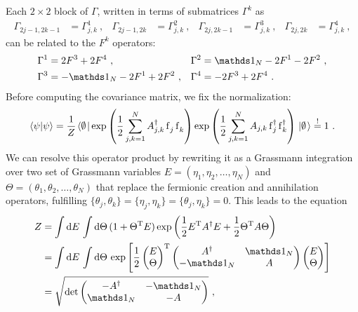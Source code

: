 \documentclass[letter]{article}
\newcommand{\intd}[1]{\int\mathrm{d}#1\,}
\begin{document}
Each $2 \times 2$ block of $\Gamma$, written in terms of submatrices $\Gamma^k$ as
\begin{equation}
\begin{aligned}
\Gamma_{2j-1,2k-1} &= \Gamma^1_{j,k} \ ,&
\Gamma_{2j-1,2k} &= \Gamma^2_{j,k} \ , &
\Gamma_{2j,2k-1} &= \Gamma^3_{j,k} \ ,&
\Gamma_{2j,2k} &= \Gamma^4_{j,k} \ ,
\end{aligned}
\end{equation}
can be related to the $F^k$ operators:
\begin{equation}
\begin{aligned}
\Gamma^1 &= 2F^3 + 2F^4 \ ,&
\Gamma^2 &= \id_N -2F^1 - 2F^2 \ ,\\
\Gamma^3 &= -\id_N - 2 F^1 + 2F^2 \ ,&
\Gamma^4 &= -2F^3 + 2F^4 \ .
\end{aligned}
\end{equation}
Before computing the covariance matrix, we fix the normalization:
\begin{equation}
\braket{\psi}\psi = \frac{1}{Z} \vacbra \exp\left( \frac{1}{2} \sum_{j,k=1}^N A^\dagger_{j,k} \fe_j \fe_k \right) \exp\left( \frac{1}{2} \sum_{j,k=1}^N A_{j,k} \fd_j \fd_k \right) \vacket \overset{!}{=} 1 \ .
\end{equation}
We can resolve this operator product by rewriting it as a Grassmann integration over two set of Grassmann variables $E=(\eta_1,\eta_2,\dots,\eta_N)$ and $\Theta=(\theta_1,\theta_2,\dots,\theta_N)$ that replace the fermionic creation and annihilation operators, fulfilling $\{ \theta_j,\theta_k \} = \{ \eta_j,\eta_k \} =\{ \theta_j,\eta_k \} = 0$. This leads to the equation
\begin{align}
Z &= \intd{E}\intd{\Theta} ( 1 + \Theta^\mathrm{T} E) \exp\left( \frac{1}{2} E^\mathrm{T} A^\dagger E + \frac{1}{2} \Theta^\mathrm{T} A \Theta \right) \nonumber\\
&= \intd{E}\intd{\Theta}
\exp\left[
\frac{1}{2}
\begin{pmatrix}
E \\
\Theta
\end{pmatrix}^\mathrm{T}
\begin{pmatrix}
A^\dagger & \id_N \\
-\id_N    & A
\end{pmatrix}
\begin{pmatrix}
E \\
\Theta
\end{pmatrix}
\right] \nonumber\\
&= \sqrt{\det{
\begin{pmatrix}
-A^\dagger & -\id_N \\
\id_N    & -A
\end{pmatrix}}} \ ,
\end{align}
\end{document}

